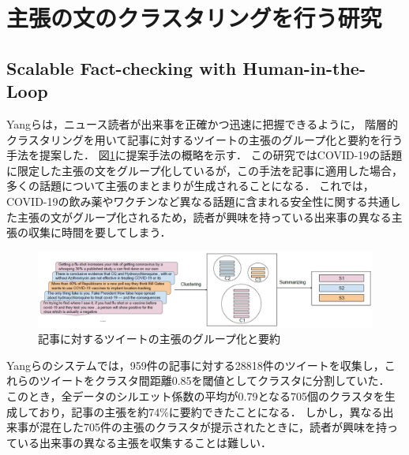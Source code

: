 \documentclass[12pt,a4j,dvipdfmx]{jreport}
\begin{document}


\section{主張の文のクラスタリングを行う研究}

\subsection{Scalable Fact-checking with Human-in-the-Loop}
\label{subsection_scalable_fact_checking}

Yangらは，ニュース読者が出来事を正確かつ迅速に把握できるように，
階層的クラスタリングを用いて記事に対するツイートの主張のグループ化と要約を行う手法を提案した\cite{yang_scalable_2021}．
図\ref{fig_scalable_fact_checking_pipeline}に提案手法の概略を示す．
この研究ではCOVID-19の話題に限定した主張の文をグループ化しているが，この手法を記事に適用した場合，多くの話題について主張のまとまりが生成されることになる．
これでは，COVID-19の飲み薬やワクチンなど異なる話題に含まれる安全性に関する共通した主張の文がグループ化されるため，読者が興味を持っている出来事の異なる主張の収集に時間を要してしまう．

\begin{figure}[H]
	\centering
	\includegraphics[keepaspectratio, width=120mm]{img/scalable_fact_checking_pipeline.png}
	\caption{
    記事に対するツイートの主張のグループ化と要約
    \protect\footnotemark[14]
  }
	\label{fig_scalable_fact_checking_pipeline}
\end{figure}

Yangらのシステムでは，959件の記事に対する28818件のツイートを収集し，これらのツイートをクラスタ間距離0.85を閾値としてクラスタに分割していた．
このとき，全データのシルエット係数の平均が0.79となる705個のクラスタを生成しており，記事の主張を約74\%に要約できたことになる．
しかし，異なる出来事が混在した705件の主張のクラスタが提示されたときに，読者が興味を持っている出来事の異なる主張を収集することは難しい．
\end{document}
